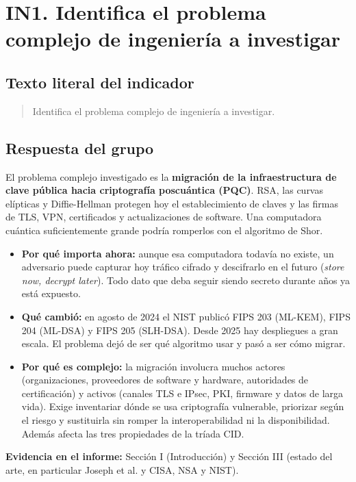 \section*{IN1. Identifica el problema complejo de ingeniería a investigar}

\subsection*{Texto literal del indicador}
\begin{quote}
Identifica el problema complejo de ingeniería a investigar.
\end{quote}

\subsection*{Respuesta del grupo}
El problema complejo investigado es la \textbf{migración de la infraestructura de clave pública hacia criptografía poscuántica (PQC)}. RSA, las curvas elípticas y Diffie-Hellman protegen hoy el establecimiento de claves y las firmas de TLS, VPN, certificados y actualizaciones de software. Una computadora cuántica suficientemente grande podría romperlos con el algoritmo de Shor.

\begin{itemize}[leftmargin=*]
  \item \textbf{Por qué importa ahora:} aunque esa computadora todavía no existe, un adversario puede capturar hoy tráfico cifrado y descifrarlo en el futuro (\textit{store now, decrypt later}). Todo dato que deba seguir siendo secreto durante años ya está expuesto.
  \item \textbf{Qué cambió:} en agosto de 2024 el NIST publicó FIPS 203 (ML-KEM), FIPS 204 (ML-DSA) y FIPS 205 (SLH-DSA). Desde 2025 hay despliegues a gran escala. El problema dejó de ser qué algoritmo usar y pasó a ser cómo migrar.
  \item \textbf{Por qué es complejo:} la migración involucra muchos actores (organizaciones, proveedores de software y hardware, autoridades de certificación) y activos (canales TLS e IPsec, PKI, firmware y datos de larga vida). Exige inventariar dónde se usa criptografía vulnerable, priorizar según el riesgo y sustituirla sin romper la interoperabilidad ni la disponibilidad. Además afecta las tres propiedades de la tríada CID.
\end{itemize}

\textbf{Evidencia en el informe:} Sección I (Introducción) y Sección III (estado del arte, en particular Joseph et al. y CISA, NSA y NIST).

